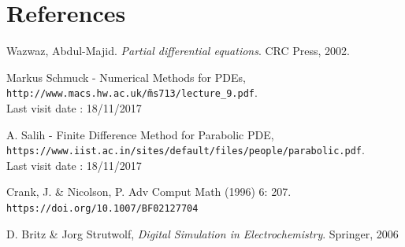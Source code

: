 \documentclass{article}
\begin{document}
        \section{References}
        \begin{thebibliography}{9}
            Wazwaz, Abdul-Majid. \textit{Partial differential equations}. CRC Press, 2002.
    
            Markus Schmuck - Numerical Methods for PDEs,
            \\\texttt{http://www.macs.hw.ac.uk/\~ms713/lecture\_9.pdf}.
            \\Last visit date : 18/11/2017
    
            A. Salih - Finite Difference Method for Parabolic PDE,
            \\\texttt{https://www.iist.ac.in/sites/default/files/people/parabolic.pdf}.
            \\Last visit date : 18/11/2017
    
            
            Crank, J. & Nicolson, P. Adv Comput Math (1996) 6: 207. 
            \\\texttt{https://doi.org/10.1007/BF02127704}
    
            D. Britz \& Jorg Strutwolf, \textit{Digital Simulation in Electrochemistry}.
            Springer, 2006
    
            
            
        \end{thebibliography}
        \newpage
\end{document}
